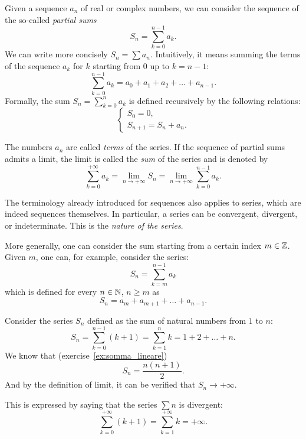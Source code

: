 Given a sequence $a_n$ of real or complex numbers, we can consider the sequence
of the so-called \emph{partial sums}%
%
\[
  S_n = \sum_{k=0}^{n-1} a_k.
\]
We can write more concisely $S_n = \sum a_n$.
Intuitively, it means summing the terms of the sequence $a_k$ for $k$ starting
from $0$ up to $k=n-1$:
\[
  \sum_{k=0}^{n-1} a_k = a_0 + a_1 + a_2 + \dots + a_{n-1}.
\]
Formally, the sum $S_n=\displaystyle \sum_{k=0}^n a_k$ is defined recursively by
the following relations:
\[
  \begin{cases}
    S_0 = 0, \\
    S_{n+1} = S_n + a_{n}.
  \end{cases}
\]

The numbers $a_n$ are called \emph{terms}%
%
 of the series.
%
If the sequence of partial sums admits a limit, the limit is called the
\emph{sum}%
%
%
of the series and is denoted by
\[
  \sum_{k=0}^{+\infty} a_k 
  = \lim_{n\to +\infty} S_n 
  = \lim_{n\to+\infty} \sum_{k=0}^{n-1} a_k.
\]

The terminology already introduced for sequences also applies to series, which
are indeed sequences themselves. In particular, a series can be convergent,
divergent, or indeterminate. This is the \emph{nature of the series}.
%
%
%

More generally, one can consider the sum starting from a certain index $m\in
{\mathbb Z}$. Given $m$, one can, for example, consider the series:
\[
  S_n = \sum_{k=m}^{n-1} a_k
\]
which is defined for every $n\in{\mathbb N}$, $n\ge m$ as
\[
  S_n = a_m + a_{m+1} + \dots + a_{n-1}.
\]

\begin{example}
Consider the series $S_n$ defined as the sum of natural numbers from $1$ to $n$:
\[
  S_n 
  = \sum_{k=0}^{n-1} (k+1)
  = \sum_{k=1}^{n} k
  = 1 + 2 + \dots + n.
\]
We know that (exercise~\ref{ex:somma_lineare})
\[
  S_n = \frac{n(n+1)}{2}.
\]
And by the definition of limit, it can be verified that $S_n \to +\infty$.

This is expressed by saying that the series $\sum n$ is divergent:
\[
  \sum_{k=0}^{+\infty} (k+1)
  = \sum_{k=1}^{+\infty} k 
  = +\infty.
\]
\end{example}

